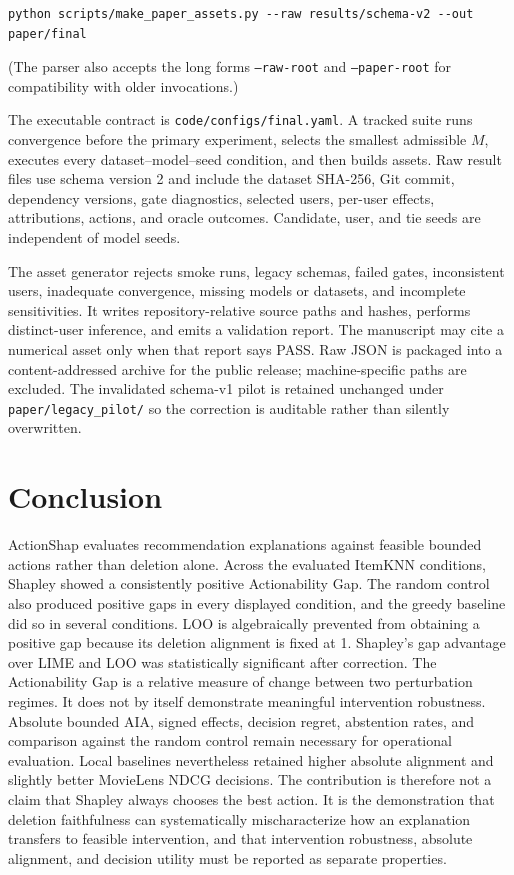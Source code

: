 \documentclass[11pt]{article}
\begin{document}
\begin{verbatim}
python scripts/make_paper_assets.py --raw results/schema-v2 --out paper/final
\end{verbatim}

(The parser also accepts the long forms \texttt{--raw-root} and \texttt{--paper-root} for compatibility with older invocations.)

The executable contract is \texttt{code/configs/final.yaml}. A tracked suite runs convergence before the primary experiment, selects the smallest admissible $M$, executes every dataset--model--seed condition, and then builds assets. Raw result files use schema version 2 and include the dataset SHA-256, Git commit, dependency versions, gate diagnostics, selected users, per-user effects, attributions, actions, and oracle outcomes. Candidate, user, and tie seeds are independent of model seeds.

The asset generator rejects smoke runs, legacy schemas, failed gates, inconsistent users, inadequate convergence, missing models or datasets, and incomplete sensitivities. It writes repository-relative source paths and hashes, performs distinct-user inference, and emits a validation report. The manuscript may cite a numerical asset only when that report says PASS. Raw JSON is packaged into a content-addressed archive for the public release; machine-specific paths are excluded. The invalidated schema-v1 pilot is retained unchanged under \texttt{paper/legacy\_pilot/} so the correction is auditable rather than silently overwritten.

\section{Conclusion}
ActionShap evaluates recommendation explanations against feasible bounded actions rather than deletion alone. Across the evaluated ItemKNN conditions, Shapley showed a consistently positive Actionability Gap. The random control also produced positive gaps in every displayed condition, and the greedy baseline did so in several conditions. LOO is algebraically prevented from obtaining a positive gap because its deletion alignment is fixed at 1. Shapley's gap advantage over LIME and LOO was statistically significant after correction. The Actionability Gap is a relative measure of change between two perturbation regimes. It does not by itself demonstrate meaningful intervention robustness. Absolute bounded AIA, signed effects, decision regret, abstention rates, and comparison against the random control remain necessary for operational evaluation. Local baselines nevertheless retained higher absolute alignment and slightly better MovieLens NDCG decisions. The contribution is therefore not a claim that Shapley always chooses the best action. It is the demonstration that deletion faithfulness can systematically mischaracterize how an explanation transfers to feasible intervention, and that intervention robustness, absolute alignment, and decision utility must be reported as separate properties.
\end{document}

